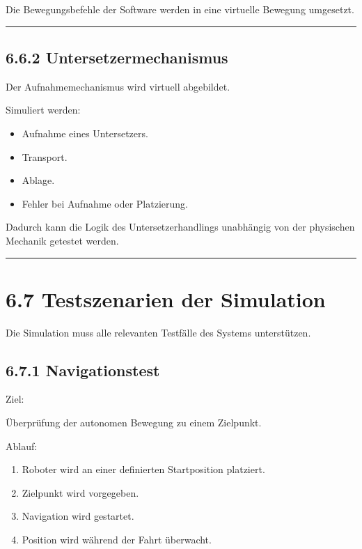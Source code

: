 \documentclass[
  a4paper,
  12pt,
  DIV=12,        %
  parskip=half,  %
  headings=small %
]{scrartcl}
\theoremstyle{definition}
\providecommand{\tightlist}{%
  \setlength{\itemsep}{0pt}\setlength{\parskip}{0pt}}
\theoremstyle{definition}
\providecommand{\tightlist}{%
  \setlength{\itemsep}{0pt}\setlength{\parskip}{0pt}}
\begin{document}
Die Bewegungsbefehle der Software werden in eine virtuelle Bewegung
umgesetzt.

\begin{center}\rule{0.5\linewidth}{0.5pt}\end{center}

\subsection{6.6.2 Untersetzermechanismus}\label{untersetzermechanismus}

Der Aufnahmemechanismus wird virtuell abgebildet.

Simuliert werden:

\begin{itemize}
\tightlist
\item
  Aufnahme eines Untersetzers.
\item
  Transport.
\item
  Ablage.
\item
  Fehler bei Aufnahme oder Platzierung.
\end{itemize}

Dadurch kann die Logik des Untersetzerhandlings unabhängig von der
physischen Mechanik getestet werden.

\begin{center}\rule{0.5\linewidth}{0.5pt}\end{center}

\section{6.7 Testszenarien der
Simulation}\label{testszenarien-der-simulation}

Die Simulation muss alle relevanten Testfälle des Systems unterstützen.

\subsection{6.7.1 Navigationstest}\label{navigationstest}

Ziel:

Überprüfung der autonomen Bewegung zu einem Zielpunkt.

Ablauf:

\begin{enumerate}
\def\labelenumi{\arabic{enumi}.}
\tightlist
\item
  Roboter wird an einer definierten Startposition platziert.
\item
  Zielpunkt wird vorgegeben.
\item
  Navigation wird gestartet.
\item
  Position wird während der Fahrt überwacht.
\end{enumerate}
\end{document}
